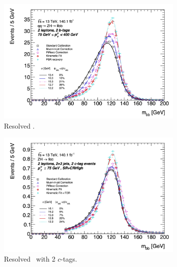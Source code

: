 \begin{figure}[h!]
  \centering
  \begin{subfigure}[b]{0.49\textwidth}
    \includegraphics[width=\textwidth]{Images/VH/Correct/CorrectedDist/bbR.png}
  \caption{Resolved \vhb.} 
  \end{subfigure}
  \begin{subfigure}[b]{0.49\textwidth}
    \includegraphics[width=\textwidth]{Images/VH/Correct/CorrectedDist/ccR.png}
    \caption{Resolved \vhc\ with 2 $c$-tags.}
  \end{subfigure} \\
  \begin{subfigure}[b]{0.49\textwidth}

\end{subfigure}
\end{figure}
